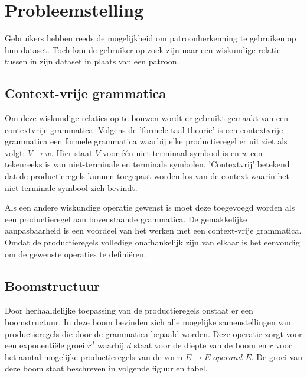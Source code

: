 \documentclass[Main.tex]{subfiles}
\begin{document}
\section{Probleemstelling}
Gebruikers hebben reeds de mogelijkheid om patroonherkenning te gebruiken op hun dataset. Toch kan de gebruiker op zoek zijn naar een wiskundige relatie tussen in zijn dataset in plaats van een patroon.
\subsection{Context-vrije grammatica}
Om deze wiskundige relaties op te bouwen wordt er gebruikt gemaakt van een contextvrije grammatica. Volgens de 'formele taal theorie'\cite{} is een contextvrije grammatica een formele grammatica waarbij elke productieregel er uit ziet als volgt: $V \rightarrow w$. Hier staat $V$  voor \'e\'en niet-terminaal symbool is en $w$ een tekenreeks is van niet-terminale en terminale symbolen. 'Contextvrij' betekend dat de productieregels kunnen toegepast worden los van de context waarin het niet-terminale symbool zich bevindt. \\

\begin{center}
\end{center} 

Als een andere wiskundige operatie gewenst is moet deze toegevoegd worden als een productieregel aan bovenstaande grammatica. De gemakkelijke aanpasbaarheid is een voordeel van het werken met een context-vrije grammatica. Omdat de productieregels volledige onafhankelijk zijn van elkaar is het eenvoudig om de gewenste operaties te defini\"eren.

\subsection{Boomstructuur}

Door herhaaldelijke toepassing van de productieregels onstaat er een boomstructuur. In deze boom bevinden zich alle mogelijke samenstellingen van productieregels die door de grammatica bepaald worden. Deze operatie zorgt voor een exponenti\"ele groei $r^{d}$ waarbij $d$ staat voor de diepte van de boom en $r$ voor het aantal mogelijke productieregels van de vorm $E \rightarrow E$  $operand$ $ E$. De groei van deze boom staat beschreven in volgende figuur en tabel. %
\end{document}
